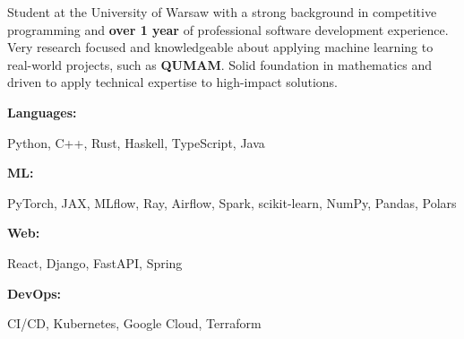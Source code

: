 \documentclass[8pt]{developercv} %
\begin{document}

\begin{minipage}[t]{0.45\textwidth}
	\vspace{-6pt}
 
	Student at the University of Warsaw with a strong background in competitive programming and \textbf{over 1 year} of professional software development experience. Very research focused and knowledgeable about applying machine learning to real-world projects, such as \textbf{QUMAM}. Solid foundation in mathematics and driven to apply technical expertise to high-impact solutions.
\end{minipage}
\hfill %
\begin{minipage}[t]{0.50\textwidth}
    \vspace{-6pt}
    
    \begin{minipage}[t]{0.15\textwidth}
        \textbf{Languages:}
    \end{minipage}
    \hfill
    \begin{minipage}[t]{0.75\textwidth}
    Python, C++, Rust, Haskell, TypeScript, Java
    \end{minipage}
    \vspace{2mm}
    
    \begin{minipage}[t]{0.15\textwidth}
        \textbf{ML:}
    \end{minipage}
    \hfill
    \begin{minipage}[t]{0.75\textwidth}
      PyTorch, JAX, MLflow, Ray, Airflow, Spark, scikit-learn, NumPy, Pandas, Polars
    \end{minipage}
    \vspace{2mm}

    \begin{minipage}[t]{0.15\textwidth}
        \textbf{Web:}
    \end{minipage}
    \hfill
    \begin{minipage}[t]{0.75\textwidth}
      React, Django, FastAPI, Spring
    \end{minipage}
    \vspace{2mm}

    \begin{minipage}[t]{0.14\textwidth}
        \textbf{DevOps:}
    \end{minipage}
    \hfill
    \begin{minipage}[t]{0.76\textwidth}
     CI/CD, Kubernetes, Google Cloud, Terraform
    \end{minipage}
\end{minipage}
\end{document}
